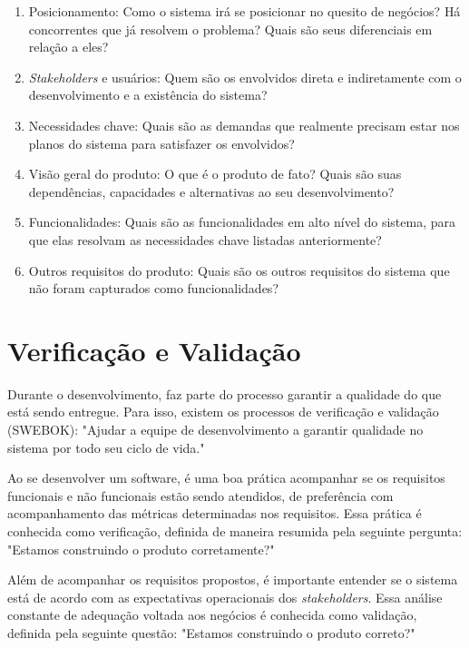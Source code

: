 \begin{enumerate}
    \item Posicionamento: Como o sistema irá se posicionar no quesito de negócios? Há concorrentes que já resolvem o problema? Quais são seus diferenciais em relação a eles?
    \item \textit{Stakeholders} e usuários: Quem são os envolvidos direta e indiretamente com o desenvolvimento e a existência do sistema?
    \item Necessidades chave: Quais são as demandas que realmente precisam estar nos planos do sistema para satisfazer os envolvidos?
    \item Visão geral do produto: O que é o produto de fato? Quais são suas dependências, capacidades e alternativas ao seu desenvolvimento?
    \item Funcionalidades: Quais são as funcionalidades em alto nível do sistema, para que elas resolvam as necessidades chave listadas anteriormente?
    \item Outros requisitos do produto: Quais são os outros requisitos do sistema que não foram capturados como funcionalidades?
\end{enumerate}

\section{Verificação e Validação}
Durante o desenvolvimento, faz parte do processo garantir a qualidade do que está sendo entregue. Para isso, existem os processos de verificação e validação (SWEBOK)\cite[cap.~10, p.~6]{ieeecomputersociety2014}: "Ajudar a equipe de desenvolvimento a garantir qualidade no sistema por todo seu ciclo de vida."

Ao se desenvolver um software, é uma boa prática acompanhar se os requisitos funcionais e não funcionais estão sendo atendidos, de preferência com acompanhamento das métricas determinadas nos requisitos. Essa prática é conhecida como verificação, definida de maneira resumida pela seguinte pergunta\cite[cap. ~10, p. ~6]{ieeecomputersociety2014}: "Estamos construindo o produto corretamente?"

Além de acompanhar os requisitos propostos, é importante entender se o sistema está de acordo com as expectativas operacionais dos \textit{stakeholders}. Essa análise constante de adequação voltada aos negócios é conhecida como validação, definida pela seguinte questão\cite[cap. ~10, p. ~6]{ieeecomputersociety2014}: "Estamos construindo o produto correto?"

